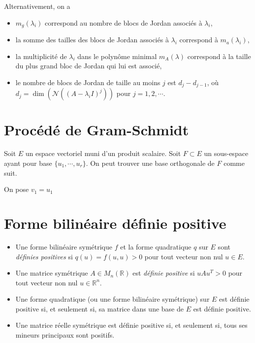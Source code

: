 \documentclass{article}
\begin{document}
	Alternativement, on a
	\begin{itemize}[nosep]
		\item $m_g(\lambda_i)$ correspond au nombre de blocs de Jordan associ\'es \`a $\lambda_i$,
		\item la somme des tailles des blocs de Jordan associ\'es \`a $\lambda_i$ correspond \`a $m_a(\lambda_i)$,
		\item la multiplicit\'e de $\lambda_i$ dans le polyn\^ome minimal $m_A(\lambda)$ correspond \`a la taille du plus grand bloc de Jordan qui lui est associ\'e,
		\item le nombre de blocs de Jordan de taille au moins $j$ est $d_j-d_{j-1}$, o\`u $d_j = \dim(\mathcal{N}((A-\lambda_iI)^j))$ pour $j = 1,2,\dotsb$.
	\end{itemize}
	
	\section{Proc\'ed\'e de Gram-Schmidt}
	Soit $E$ un espace vectoriel muni d'un produit scalaire. Soit $F \subset E$ un sous-espace ayant pour base $\{u_1,\dotsb,u_r\}$. On peut trouver une base orthogonale de $F$ comme suit.
	
	\begin{algorithm}[H]
		\caption{Proc\'ed\'e de Gram-Schmidt pour orthogonaliser une base}
		
		\BlankLine
		On pose $v_1 = u_1$\;
	\end{algorithm}
	
	\section{Forme bilin\'eaire d\'efinie positive}
	\begin{itemize}[nosep]
		\item Une forme bilin\'eaire sym\'etrique $f$ et la forme quadratique $q$ sur $E$ sont \emph{d\'efinies positives} si $q(u) = f(u,u) > 0$ pour tout vecteur non nul $u \in E$.
		\item Une matrice sym\'etrique $A \in M_n(\mathbb{R})$ est \emph{d\'efinie positive} si $uAu^T > 0$ pour tout vecteur non nul $u \in \mathbb{R}^n$.
		\item Une forme quadratique (ou une forme bilin\'eaire sym\'etrique) sur $E$ est d\'efinie positive si, et seulement si, sa matrice dans une base de $E$ est d\'efinie positive.
		\item Une matrice r\'eelle sym\'etrique est d\'efinie positive si, et seulement si, tous ses mineurs principaux sont positifs.
	\end{itemize}
	
\end{document}
